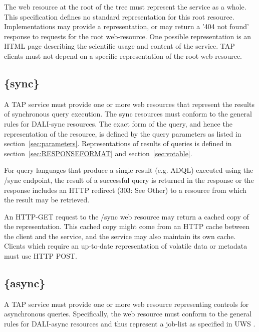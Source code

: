 \documentclass[11pt,letter]{ivoa}
\begin{document}
The web resource at the root of the tree must represent the service as a whole. 
This specification defines no standard representation for this root resource. 
Implementations may provide a representation, or may return a '404 not found' 
response to requests for the root web-resource. One possible representation is 
an HTML page describing the scientific usage and content of the service. TAP 
clients must not depend on a specific representation of the root web-resource.

\subsection{\{sync\}}
\label{sec:tap-sync}

A TAP service must provide one or more web resources that represent the results 
of synchronous query execution. The {sync} resources must conform to the general rules for
DALI-sync  resources. The exact form of the query, and hence the 
representation of the resource, is defined by the  query parameters as listed in 
section~\ref{sec:parameters}. Representations of results of queries is defined in 
section~\ref{sec:RESPONSEFORMAT} and section~\ref{sec:votable}.

For query languages that produce a single result (e.g. ADQL) executed using the 
/sync endpoint, the result of a successful query is returned in the response or 
the response includes an HTTP redirect (303: See Other) to a resource from 
which the result may be retrieved.

An HTTP-GET request to the /sync web resource may return a cached copy of the 
representation. This cached copy might come from an HTTP cache between the 
client and the service, and the service may also maintain its own cache. Clients 
which require an up-to-date representation of volatile data or metadata must use 
HTTP POST.

\subsection{\{async\}}
\label{sec:tap-async}

A TAP service must provide one or more web resource representing controls for 
asynchronous queries. Specifically, the web resource must conform to the general rules
for DALI-async resources and thus represent a job-list 
as specified in UWS \citep{std:UWS}.
\end{document}
